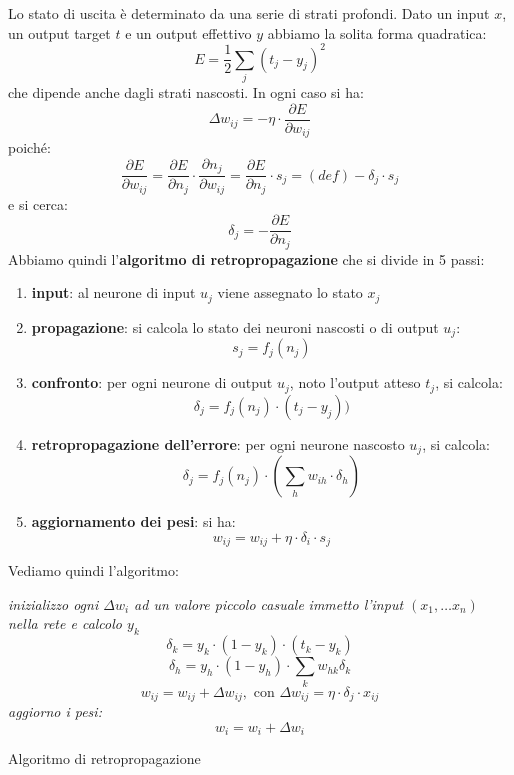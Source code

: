 \documentclass[a4paper,12pt, oneside]{book}
\begin{document}
Lo stato di uscita è determinato da una serie di strati profondi. Dato un input
$x$, un output target $t$ e un output effettivo $y$ abbiamo la solita forma
quadratica:
\[E=\frac{1}{2}\sum_j(t_j-y_j)^2\]
che dipende anche dagli strati nascosti. In ogni caso si ha:
\[\Delta w_{ij}=-\eta\cdot\frac{\partial E}{\partial w_{ij}}\]
poiché:
\[\frac{\partial E}{\partial w_{ij}}= \frac{\partial E}{\partial n_{j}}\cdot
  \frac{\partial n_j}{\partial w_{ij}}= \frac{\partial E}{\partial n_{j}}\cdot
  s_j=(def)-\delta_j\cdot s_j\]
e si cerca:
\[\delta_j=-\frac{\partial E}{\partial n_{j}}\]
Abbiamo quindi l'\textbf{algoritmo di retropropagazione} che si divide in 5
passi:
\begin{enumerate}
  \item \textbf{input}: al neurone di input $u_j$ viene assegnato lo stato $x_j$
  
  \item \textbf{propagazione}: si calcola lo stato dei neuroni nascosti o di
  output $u_j$:
  \[s_j=f_j(n_j)\]
  \item \textbf{confronto}: per ogni neurone di output $u_j$, noto l’output
  atteso $t_j$, si calcola:
  \[\delta_j=f_j(n_j)\cdot(t_j-y_j))\]
  \item \textbf{retropropagazione dell’errore}: per ogni neurone nascosto $u_j$,
  si calcola:
  \[\delta_j=f_j(n_j)\cdot\left(\sum_h w_{ih}\cdot \delta_h\right)\]
  \item \textbf{aggiornamento dei pesi}: si ha:
  \[w_{ij}=w_{ij}+\eta\cdot \delta_i\cdot s_j\]
\end{enumerate}
Vediamo quindi l'algoritmo:
\begin{algorithm}[H]
  \begin{algorithmic}
    \State \textit{inizializzo ogni $\Delta w_i$ ad un valore piccolo casuale}
    \State \textit{immetto l'input $( x_1, \ldots x_n)$ nella rete e calcolo
    $y_k$}  
    \[\delta_k=y_k\cdot(1-y_k)\cdot(t_k-y_k)\]
    \EndFor
    \[\delta_h=y_h\cdot(1-y_h)\cdot\sum_k w_{hk}\delta_k\]
    \EndFor
    \[w_{ij}=w_{ij}+\Delta w_{ij},\mbox{ con } \Delta w_{ij}=\eta\cdot\delta_j\cdot x_{ij}\] 
    \EndFor
    \EndFor
    \EndWhile
    \State \textit{aggiorno i pesi:}
    \[w_i=w_i+\Delta w_i\]
    \EndFunction
  \end{algorithmic}
  \caption{Algoritmo di retropropagazione}
\end{algorithm}
\end{document}

